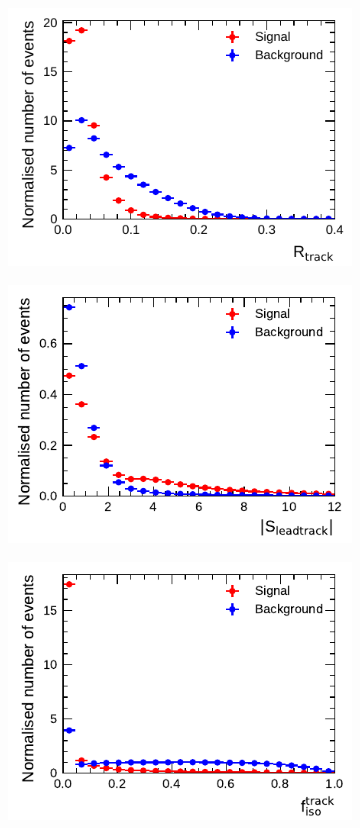 \begin{figure}[htbp]
\begin{subfigure}{0.5\textwidth}
  \end{subfigure}
  \begin{subfigure}{0.5\textwidth}
    \centering
    \includegraphics{./figures/baseline_bdt_vars/1p/innerTrkAvgDist_fixed.pdf}
  \end{subfigure}%
  \begin{subfigure}{0.5\textwidth}
    \centering
    \includegraphics{./figures/baseline_bdt_vars/1p/absipSigLeadTrk.pdf}
  \end{subfigure}
  \begin{subfigure}{0.5\textwidth}
    \centering
    \includegraphics{./figures/baseline_bdt_vars/1p/SumPtTrkFrac.pdf}

\end{subfigure}
\end{figure}
